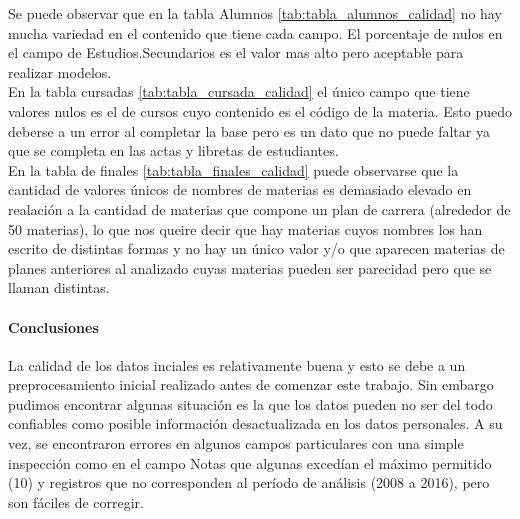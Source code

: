 




Se puede observar que en la tabla Alumnos \ref{tab:tabla_alumnos_calidad} no hay mucha variedad en el contenido que tiene cada campo. El porcentaje de nulos en el campo de Estudios.Secundarios es el valor mas alto pero aceptable para realizar modelos.\\

En la tabla cursadas \ref{tab:tabla_cursada_calidad} el único campo que tiene valores nulos es el de cursos cuyo contenido es el código de la materia. Esto puedo deberse a un error al completar la base pero es un dato que no puede faltar ya que se completa en las actas y libretas de estudiantes.\\

En la tabla de finales \ref{tab:tabla_finales_calidad} puede observarse que la cantidad de valores únicos de nombres de materias es demasiado elevado en realación a la cantidad de materias que compone un plan de carrera (alrededor de 50 materias), lo que nos queire decir que hay materias cuyos nombres los han escrito de distintas formas y no hay un único valor y/o que aparecen materias de planes anteriores al analizado cuyas materias pueden ser parecidad pero que se llaman distintas.


\paragraph{\textbf{Conclusiones}}
La calidad de los datos inciales es relativamente buena y esto se debe a un preprocesamiento inicial realizado antes de comenzar este trabajo. Sin embargo pudimos encontrar algunas situación es la que los datos pueden no ser del todo confiables como posible información desactualizada en los datos personales. A su vez, se encontraron errores en algunos campos particulares con una simple inspección como en el campo Notas que algunas excedían el máximo permitido (10) y registros que no corresponden al período de análisis (2008 a 2016), pero son fáciles de corregir.

